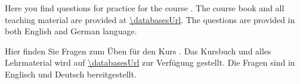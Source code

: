 %
\begin{NoHyper}%
Here you find questions for practice for the course .
The course book and all teaching material are provided at \expandafter\url{\databasesUrl}.
The questions are provided in both English and German language.

Hier finden Sie Fragen zum Üben für den Kurs .
Das Kursbuch und alles Lehrmaterial wird auf \expandafter\url{\databasesUrl} zur Verfügung gestellt.
Die Fragen sind in Englisch und Deutsch bereitgestellt.%
\end{NoHyper}%
%
